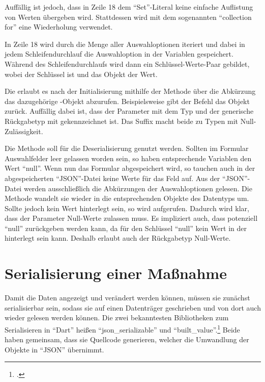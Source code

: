 Auffällig ist jedoch, dass in Zeile 18 dem \enquote{Set}-Literal keine einfache Auflistung von Werten übergeben wird.
Stattdessen wird mit dem sogenannten \enquote{collection for} eine Wiederholung verwendet.



In Zeile 18 wird durch die  Menge aller Auswahloptionen  iteriert und dabei in jedem Schleifendurchlauf die Auswahloption in der Variablen  gespeichert.
Während des Schleifendurchlaufs wird dann ein Schlüssel-Werte-Paar gebildet, wobei  der Schlüssel ist und das Objekt  der Wert.

Die   erlaubt es nach der Initialisierung mithilfe der Methode   über die Abkürzung das dazugehörige -Objekt abzurufen.
Beispielsweise gibt der Befehl  das Objekt  zurück.
Auffällig dabei ist, dass der Parameter  mit dem Typ  und der generische Rückgabetyp mit  gekennzeichnet ist. Das Suffix  macht beide zu Typen mit Null-Zulässigkeit.



Die Methode  soll für die Deserialisierung genutzt werden.
 Sollten im Formular Auswahlfelder leer gelassen worden sein, so haben  entsprechende Variablen den Wert \enquote{null}.
Wenn nun das Formular abgespeichert wird, so tauchen auch in der abgespeicherten \enquote{JSON}-Datei keine Werte für das Feld auf.
Aus der \enquote{JSON}-Datei werden ausschließlich die Abkürzungen der Auswahloptionen gelesen.
Die Methode  wandelt sie wieder in die entsprechenden Objekte des Datentyps  um.
Sollte jedoch kein Wert hinterlegt sein, so wird  aufgerufen. Dadurch wird klar,
dass der Parameter Null-Werte zulassen muss.
Es impliziert auch,
dass potenziell \enquote{null} zurückgeben werden kann, da für den Schlüssel \enquote{null} kein Wert in der  hinterlegt sein kann.
Deshalb  erlaubt auch der Rückgabetyp  Null-Werte.


\section{Serialisierung einer Maßnahme}

Damit die Daten angezeigt und verändert werden können, müssen sie zunächst serialisierbar sein, sodass sie auf einen Datenträger geschrieben und von dort auch wieder gelesen werden können.
Die zwei bekanntesten Bibliotheken zum Serialisieren in \enquote{Dart} heißen \enquote{json_serializable} und \enquote{built_value}.\footcite[Vgl.][]{JSONAndSerialization}
Beide haben gemeinsam, dass sie Quellcode generieren, welcher die Umwandlung der Objekte in \enquote{JSON} übernimmt.


